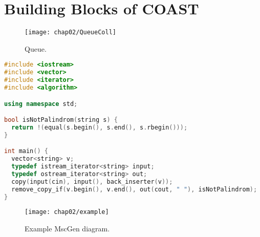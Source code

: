 \chapter{Building Blocks of COAST}\label{BuildingBlocks}

\begin{figure}[hbt]
  \centering
  \texttt{[image: chap02/QueueColl]}
  \caption{Queue.}
  \label{fig:queue}
\end{figure}

\begin{lstlisting}[language=C++, caption=Example Source]
#include <iostream>
#include <vector>
#include <iterator>
#include <algorithm>

using namespace std;

bool isNotPalindrom(string s) {
  return !(equal(s.begin(), s.end(), s.rbegin()));
}

int main() {
  vector<string> v;
  typedef istream_iterator<string> input;
  typedef ostream_iterator<string> out;
  copy(input(cin), input(), back_inserter(v));
  remove_copy_if(v.begin(), v.end(), out(cout, " "), isNotPalindrom);
}
\end{lstlisting}

\begin{figure}[hbt]
  \centering
  \texttt{[image: chap02/example]}
  \caption{Example MscGen diagram.}
  \label{fig:msc-queue}
\end{figure}

